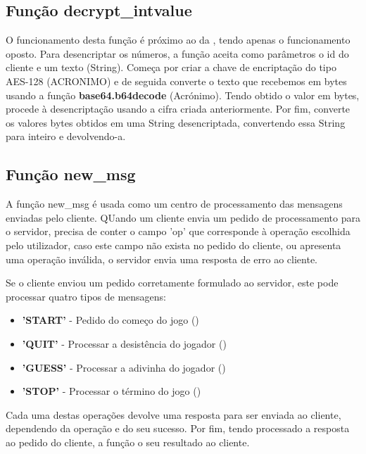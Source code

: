 \documentclass{report}
\begin{document}
\subsection{Função decrypt\_intvalue}
\label{ssec:func_decrypt_value_server}

O funcionamento desta função é próximo ao da , tendo apenas o funcionamento oposto. Para desencriptar os números, a função aceita como parâmetros o id do cliente e um texto (String). Começa por criar a chave de encriptação do tipo AES-128 (ACRONIMO) e de seguida converte o texto que recebemos em bytes usando a função \textbf{base64.b64decode} (Acrónimo). Tendo obtido o valor em bytes, procede à desencriptação usando a cifra criada anteriormente. Por fim, converte os valores bytes obtidos em uma String desencriptada, convertendo essa String para inteiro e devolvendo-a.

\subsection{Função new\_msg}
\label{ssec:func_new_msg}

A função new\_msg é usada como um centro de processamento das mensagens enviadas pelo cliente. QUando um cliente envia um pedido de processamento para o servidor, precisa de conter o campo 'op' que corresponde à operação escolhida pelo utilizador, caso este campo não exista no pedido do cliente, ou apresenta uma operação inválida, o servidor envia uma resposta de erro ao cliente.

Se o cliente enviou um pedido corretamente formulado ao servidor, este pode processar quatro tipos de mensagens:
\begin{itemize}
\item \textbf{'START'} - Pedido do começo do jogo ()
\item \textbf{'QUIT'} - Processar a desistência do jogador ()
\item \textbf{'GUESS'} - Processar a adivinha do jogador ()
\item \textbf{'STOP'} - Processar o término do jogo ()
\end{itemize}
Cada uma destas operações devolve uma resposta para ser enviada ao cliente, dependendo da operação e do seu sucesso. Por fim, tendo processado a resposta ao pedido do cliente, a função o seu resultado ao cliente. 
\end{document}
